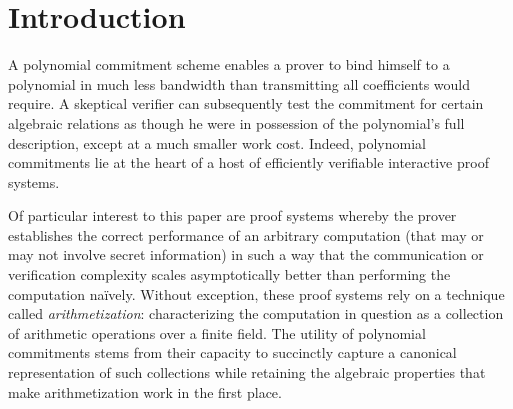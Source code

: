 

\section{Introduction}

A polynomial commitment scheme enables a prover to bind himself to a polynomial in much less bandwidth than transmitting all coefficients would require. A skeptical verifier can subsequently test the commitment for certain algebraic relations as though he were in possession of the polynomial's full description, except at a much smaller work cost. Indeed, polynomial commitments lie at the heart of a host of efficiently verifiable interactive proof systems.

Of particular interest to this paper are proof systems whereby the prover establishes the correct performance of an arbitrary computation (that may or may not involve secret information) in such a way that the communication or verification complexity scales asymptotically better than performing the computation naïvely. Without exception, these proof systems rely on a technique called \emph{arithmetization}: characterizing the computation in question as a collection of arithmetic operations over a finite field. The utility of polynomial commitments stems from their capacity to succinctly capture a canonical representation of such collections while retaining the algebraic properties that make arithmetization work in the first place.


